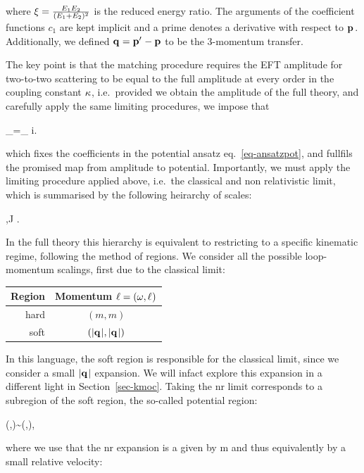 \documentclass[
  11pt,
  a4paper,
  DIV=11,
  numbers=noendperiod,
  twoside]{scrreprt}
\let\[\relax \let\]\relax %
\DeclareRobustCommand{\[}{\begin{equation}}
\DeclareRobustCommand{\]}{\end{equation}}
\begin{document}
where
\(\redEratio=\frac{\energy[1]\energy[2]}{\pa{\energy[1]+\energy[2]}^2}\)
is the reduced energy ratio. The arguments of the coefficient functions
\(c_1\) are kept implicit and a prime denotes a derivative with respect
to \(\tv{\emom}\). Additionally, we defined \(\tv{q}=\tv{p'}-\tv{p}\) to
be the 3-momentum transfer.

The key point is that the matching procedure requires the EFT amplitude
for two-to-two scattering to be equal to the full amplitude at every
order in the coupling constant \(\coupling\), i.e.~provided we obtain
the amplitude of the full theory, and carefully apply the same limiting
procedures, we impose that

\[
\ampl[(i)]_=\ampl[(i)]_ \quad \forall i.
\]

which fixes the coefficients in the potential ansatz
eq.~\ref{eq-ansatzpot}, and fullfils the promised map from amplitude to
potential. Importantly, we must apply the limiting procedure applied
above, i.e.~the classical and non relativistic limit, which is
summarised by the following heirarchy of scales:

\[
\mass[1],\mass[2]\ll J  \ll {}.
\]

In the full theory this hierarchy is equivalent to restricting to a
specific kinematic regime, following the method of regions. We consider
all the possible loop-momentum scalings, first due to the classical
limit:

\begin{longtable}[]{@{}rc@{}}
\toprule()
Region & Momentum \(\ell = (\omega,\tv{\ell})\) \\
\midrule()
\endhead
hard & \((m,m)\) \\
soft & \((\abs{\tv{\tm}},\abs{\tv{\tm}})\) \\
\bottomrule()
\end{longtable}

In this language, the soft region is responsible for the classical
limit, since we consider a small \(\abs{\tv{\tm}}\) expansion. We will
infact explore this expansion in a different light in
Section~\ref{sec-kmoc}. Taking the \gls{nr} limit corresponds to a
subregion of the soft region, the so-called potential region:

\[ (\omega,\tv{\ell})\sim (\abs{\tv{\vel}}\abs{\tv{\tm}},\abs{\tv{\tm}}),\]

where we use that the \gls{nr} expansion is a given by
\[\abs{\tv{\emom}}\ll m\] and thus equivalently by a small relative velocity:
\end{document}
